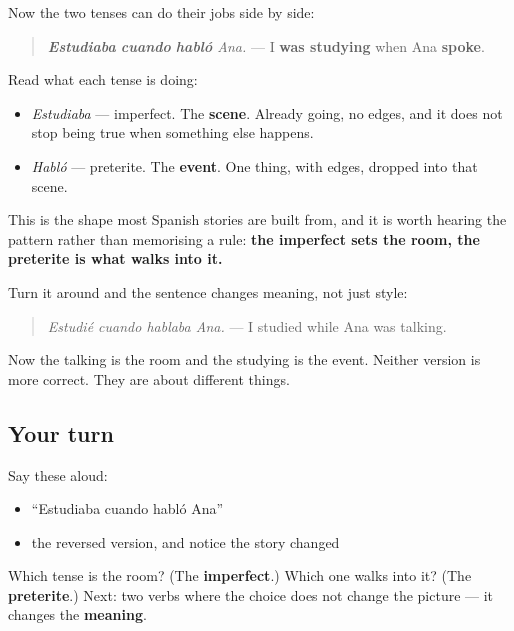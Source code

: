 \begin{grammarlens}[title={Grammar Lens: the scene and the thing that interrupts it}]
Now the two tenses can do their jobs side by side:

\begin{quote}
\emph{\textbf{Estudiaba} \textbf{cuando} \textbf{habló} Ana.} — I \textbf{was studying} when Ana \textbf{spoke}.
\end{quote}

Read what each tense is doing:

\begin{itemize}
\raggedright
  \item \emph{Estudiaba} — imperfect. The \textbf{scene}. Already going, no edges, and it does not stop being true when something else happens.
  \item \emph{Habló} — preterite. The \textbf{event}. One thing, with edges, dropped into that scene.
\end{itemize}

This is the shape most Spanish stories are built from, and it is worth hearing the pattern rather than memorising a rule: \textbf{the imperfect sets the room, the preterite is what walks into it.}

Turn it around and the sentence changes meaning, not just style:

\begin{quote}
\emph{Estudié cuando hablaba Ana.} — I studied while Ana was talking.
\end{quote}

Now the talking is the room and the studying is the event. Neither version is more correct. They are about different things.
\end{grammarlens}

\subsection*{Your turn}
Say these aloud:

\begin{itemize}
\raggedright
  \item \textquotedblleft{}Estudiaba cuando habló Ana\textquotedblright{}
  \item the reversed version, and notice the story changed
\end{itemize}

\begin{tcolorbox}[breakable,colback=teal!4,colframe=teal!35!black,title={Before you move on}]
Which tense is the room? (The \textbf{imperfect}.) Which one walks into it? (The \textbf{preterite}.) Next: two verbs where the choice does not change the picture — it changes the \textbf{meaning}.
\end{tcolorbox}
